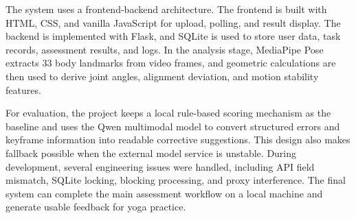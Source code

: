 The system uses a frontend-backend architecture. The frontend is built with HTML, CSS, and vanilla JavaScript for upload, polling, and result display. The backend is implemented with Flask, and SQLite is used to store user data, task records, assessment results, and logs. In the analysis stage, MediaPipe Pose extracts 33 body landmarks from video frames, and geometric calculations are then used to derive joint angles, alignment deviation, and motion stability features.

For evaluation, the project keeps a local rule-based scoring mechanism as the baseline and uses the Qwen multimodal model to convert structured errors and keyframe information into readable corrective suggestions. This design also makes fallback possible when the external model service is unstable. During development, several engineering issues were handled, including API field mismatch, SQLite locking, blocking processing, and proxy interference. The final system can complete the main assessment workflow on a local machine and generate usable feedback for yoga practice.
\EnglishAbstractTextFinish
{}
